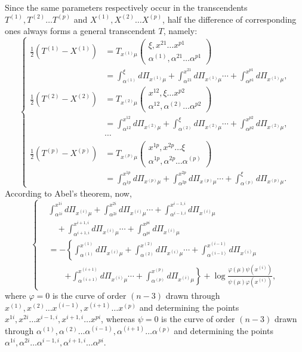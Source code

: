 \documentclass[10pt]{article}
\begin{document}
Since the same parameters respectively occur in the transcendents \(T^{(1)},T^{(2)}\ldots T^{(p)}\) and \(X^{(1)},X^{(2)}\ldots X^{(p)}\), half the difference of corresponding ones always forms a general transcendent \(T\), namely:
\begingroup\footnotesize
\[
\left\{
\begin{aligned}
\frac12(T^{(1)}-X^{(1)})
&=T_{x^{(1)}\mu}\begin{pmatrix}\xi,x^{21}\ldots x^{p1}\\ \alpha^{(1)},\alpha^{21}\ldots\alpha^{p1}\end{pmatrix} \\
&=\int_{\alpha^{(1)}}^{\xi}d\Pi_{x^{(1)}\mu}
+\int_{\alpha^{21}}^{x^{21}}d\Pi_{x^{(1)}\mu}\cdots
+\int_{\alpha^{p1}}^{x^{p1}}d\Pi_{x^{(1)}\mu},\\[0.35em]
\frac12(T^{(2)}-X^{(2)})
&=T_{x^{(2)}\mu}\begin{pmatrix}x^{12},\xi\ldots x^{p2}\\ \alpha^{12},\alpha^{(2)}\ldots\alpha^{p2}\end{pmatrix} \\
&=\int_{\alpha^{12}}^{x^{12}}d\Pi_{x^{(2)}\mu}
+\int_{\alpha^{(2)}}^{\xi}d\Pi_{x^{(2)}\mu}\cdots
+\int_{\alpha^{p2}}^{x^{p2}}d\Pi_{x^{(2)}\mu},\\[-0.2em]
&\cdots\\[-0.2em]
\frac12(T^{(p)}-X^{(p)})
&=T_{x^{(p)}\mu}\begin{pmatrix}x^{1p},x^{2p}\ldots\xi\\ \alpha^{1p},\alpha^{2p}\ldots\alpha^{(p)}\end{pmatrix} \\
&=\int_{\alpha^{1p}}^{x^{1p}}d\Pi_{x^{(p)}\mu}
+\int_{\alpha^{2p}}^{x^{2p}}d\Pi_{x^{(p)}\mu}\cdots
+\int_{\alpha^{(p)}}^{\xi}d\Pi_{x^{(p)}\mu}.
\end{aligned}
\right.
\tag{3}
\]
\endgroup
According to Abel's theorem, now,
\begingroup\footnotesize
\[
\left\{
\begin{aligned}
&\int_{\alpha^{1i}}^{x^{1i}}d\Pi_{x^{(i)}\mu}
+\int_{\alpha^{2i}}^{x^{2i}}d\Pi_{x^{(i)}\mu}\cdots
+\int_{\alpha^{i-1,i}}^{x^{i-1,i}}d\Pi_{x^{(i)}\mu} \\
&\quad +\int_{\alpha^{i+1,i}}^{x^{i+1,i}}d\Pi_{x^{(i)}\mu}\cdots
+\int_{\alpha^{pi}}^{x^{pi}}d\Pi_{x^{(i)}\mu} \\
&= -\left\{
\int_{\alpha^{(1)}}^{x^{(1)}}d\Pi_{x^{(i)}\mu}
+\int_{\alpha^{(2)}}^{x^{(2)}}d\Pi_{x^{(i)}\mu}\cdots
+\int_{\alpha^{(i-1)}}^{x^{(i-1)}}d\Pi_{x^{(i)}\mu}
\right.\\
&\qquad\left.
+\int_{\alpha^{(i+1)}}^{x^{(i+1)}}d\Pi_{x^{(i)}\mu}\cdots
+\int_{\alpha^{(p)}}^{x^{(p)}}d\Pi_{x^{(i)}\mu}\right\}
+\log\frac{\varphi(\mu)\psi(x^{(i)})}{\psi(\mu)\varphi(x^{(i)})},
\end{aligned}
\right.
\tag{4}
\]
\endgroup
where \(\varphi=0\) is the curve of order \((n-3)\) drawn through \(x^{(1)},x^{(2)}\ldots x^{(i-1)},x^{(i+1)}\ldots x^{(p)}\) and determining the points \(x^{1i},x^{2i}\ldots x^{i-1,i},x^{i+1,i}\ldots x^{pi}\), whereas \(\psi=0\) is the curve of order \((n-3)\) drawn through \(\alpha^{(1)},\alpha^{(2)}\ldots\alpha^{(i-1)},\alpha^{(i+1)}\ldots\alpha^{(p)}\) and determining the points \(\alpha^{1i},\alpha^{2i}\ldots\alpha^{i-1,i},\alpha^{i+1,i}\ldots\alpha^{pi}\).
\end{document}
